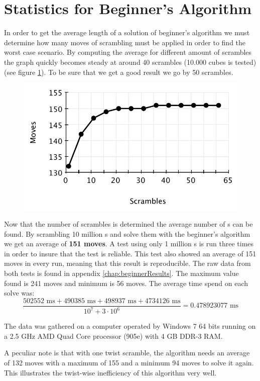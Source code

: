 \section{Statistics for Beginner's Algorithm}
\label{sec:beginnersStat}
In order to get the average length of a solution of beginner's algorithm we must determine how many moves of scrambling must be applied in order to find the worst case scenario. 
By computing the average for different amount of scrambles the graph quickly becomes steady at around 40 scrambles (10.000 cubes is tested) (see figure \ref{fig:beginnersScramble}). To be sure that we get a good result we go by 50 scrambles.
\begin{figure}[htbp]
	\centering
		\includegraphics{input/pics/beginnersScramble.pdf}
	\caption{}
	\label{fig:beginnersScramble}
\end{figure}

Now that the number of scrambles is determined the average number of \twist{}s can be found.
By scrambling 10 million \cube{}s and solve them with the beginner's algorithm we get an average of \textbf{151 moves}.
A test using only 1 million \rubik{}s is run three times in order to insure that the test is reliable.
This test also showed an average of 151 moves in every run, meaning that this result is reproducible.
The raw data from both tests is found in appendix \ref{chap:beginnerResults}.
The maximum value found is 241 moves and minimum is 56 moves.
The average time spend on each solve was:
\[
\frac{502552 \text{ ms} + 490385 \text{ ms} + 498937 \text{ ms} + 4734126 \text{ ms}}{10^{7} + 3 \cdot 10^{6}} = 0.478923077 \text{ ms}
\]

The data was gathered on a computer operated by Windows 7 64 bits running on a 2.5 GHz AMD Quad Core processor (905e) with 4 GB DDR-3 RAM.

A peculiar note is that with one twist scramble, the algorithm needs an average of 132 moves with a maximum of 155 and a minimum 94 moves to solve it again.
This illustrates the twist-wise inefficiency of this algorithm very well.